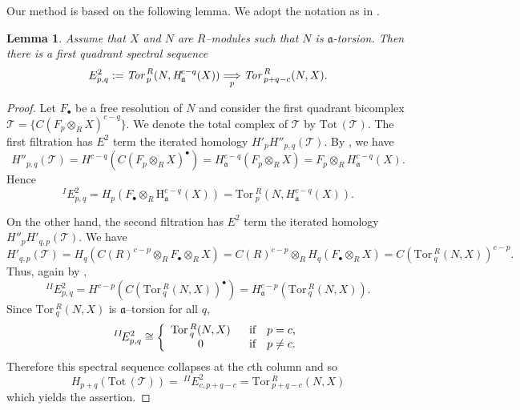 \documentclass[10pt]{amsart}
\newtheorem{lem}[thm]{Lemma}
\newcommand{\Tor}{\mbox{Tor}\,}
\newcommand{\Tot}{\mbox{Tot}\,}
\renewcommand{\H}{\mbox{H}}
\newcommand{\fa}{\mathfrak{a}}
\newcommand{\C}{C}
\begin{document}



Our method is based on the following lemma. We adopt the notation as in \cite {Rot}.

\begin{lem} \label {2-1} Assume that $X$ and $N$ are $R$--modules such that $N$ is
$\fa$-torsion. Then there is a first quadrant spectral sequence
\begin{equation} \label{2--1}
E^{2}_{p, q}:= \emph{\Tor}^{R}_{p}(N, \emph{\H}^{c-q}_{\fa}(X))
\underset{p}\Longrightarrow \emph{\Tor}^{R}_{p+q-c}(N, X).
\end{equation}
\end{lem}

\begin{proof} Let $F_{\bullet}$ be a free resolution of $N$
and consider the first quadrant bicomplex $\mathcal{T}=
\{\C(F_{p}\otimes_{R} X)^{c-q}\}$. We denote the total complex of $\mathcal{T}$ by $\Tot(\mathcal{T})$. The first filtration has $E^{2}$
term the iterated homology $H'_{p}H''_{p, q}(\mathcal{T})$. By \cite
[Theorem 5.1.19] {BS}, we have
$$H''_{p, q}(\mathcal{T})= H^{c-q}(\C(F_{p}\otimes_{R} X)^{\bullet})= H^{c-q}_{\fa}(F_{p}\otimes_{R} X)= F_{p}\otimes_{R} H^{c-q}_{\fa}(X).$$
Hence
$$^{I}\!E^{2}_{p, q}= H_{p}(F_{\bullet}\otimes_{R} \H^{c-q}_{\fa}(X))= \Tor^{R}_{p}(N, H^{c-q}_{\fa}(X)).$$

On the other hand, the second filtration has
$E^{2}$ term the iterated homology $H''_{p}H'_{q, p}(\mathcal{T})$.
We have
$$H'_{q, p}(\mathcal{T})= H_{q}(\C(R)^{c-p}\otimes_{R}F_\bullet\otimes_R X)= \C(R)^{c-p}\otimes_{R} H_{q}(F_\bullet\otimes_R X)= \C(\Tor^{R}_{q}(N, X))^{c-p}.$$
Thus, again by \cite [Theorem 5.1.19] {BS},
$$^{II}\!E^{2}_{p, q}= H^{c-p}(\C(\Tor^{R}_{q}(N, X))^{\bullet})= H^{c-p}_{\fa}(\Tor^{R}_{q}(N, X)).$$
Since $\Tor^{R}_{q}(N, X)$ is $\fa$--torsion for all $q$,
$$^{II}\!E^{2}_{p, q}\cong \left\lbrace
           \begin{array}{c l}
              \Tor^{R}_{q}(N, X)\ \   & \text{if  \ \ $p= c$,}\\
              0\ \   & \text{if  \ \ $p\neq c$.}
           \end{array}
        \right.$$
Therefore this spectral sequence collapses at the $c$th column and
so
$$H_{p+q}(\Tot (\mathcal{T}))=\ ^{II}\!E^{2}_{c, p+q-c}= \Tor^{R}_{p+q-c}(N, X)$$
which yields the assertion.
\end{proof}
\end{document}
